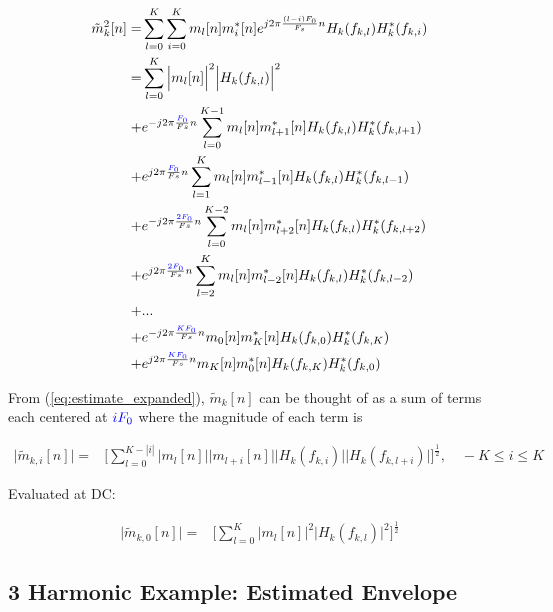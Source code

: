 \documentclass [11pt, proquest,oneside] {ganter_thesis}[2015/03/03]
\newcommand*{\mathcolor}{}
\def\mathcolor#1#{\mathcoloraux{#1}}
\newcommand*{\mathcoloraux}[3]{%
  \protect\leavevmode
  \begingroup
    \color#1{#2}#3%
  \endgroup
}
\begin{document}
\begin{align}
\tilde{m}_k^2[n] =& \sum\limits_{l=0}^K \sum\limits_{i=0}^K m_l[n] m_i^*[n] e^{j2\pi\frac{(l-i)F_0}{F_s}n} H_k(f_{k,l})H_k^*(f_{k,i}) \\
%
%
%
\label{eq:estimate_expanded}
=& \sum\limits_{l=0}^K \Big|m_l[n]\Big|^2 \Big|H_k(f_{k,l})\Big|^2 \nonumber \\
%
%
+& e^{-j2\pi \frac{\mathcolor{blue}{F_0}}{Fs}n} \sum\limits_{l=0}^{K-1} m_l[n] m_{l+1}^*[n] H_k(f_{k,l})H_k^*(f_{k,l+1}) \nonumber \\
%
+&  e^{j2\pi \frac{\mathcolor{blue}{F_0}}{Fs}n} \sum\limits_{l=1}^{K} m_l[n] m_{l-1}^*[n] H_k(f_{k,l})H_k^*(f_{k,l-1}) \nonumber \\
%
%
+& e^{-j2\pi \frac{\mathcolor{blue}{2F_0}}{Fs}n} \sum\limits_{l=0}^{K-2} m_l[n] m_{l+2}^*[n] H_k(f_{k,l})H_k^*(f_{k,l+2}) \nonumber \\
%
+& e^{j2\pi \frac{\mathcolor{blue}{2F_0}}{Fs}n}  \sum\limits_{l=2}^{K} m_l[n] m_{l-2}^*[n] H_k(f_{k,l})H_k^*(f_{k,l-2}) \nonumber \\
%
%
+& ... \nonumber \\
%
%
+& e^{-j2\pi \frac{\mathcolor{blue}{KF_0}}{Fs}n} m_0[n] m_K^*[n] H_k(f_{k,0})H_k^*(f_{k,K}) \nonumber \\
%
+& e^{j2\pi \frac{\mathcolor{blue}{KF_0}}{Fs}n}  m_K[n] m_0^*[n] H_k(f_{k,K})H_k^*(f_{k,0})
\end{align}

From (\ref{eq:estimate_expanded}), $\tilde{m}_k[n]$ can be thought of as a sum of terms each centered at $\mathcolor{blue}{iF_0}$ where the magnitude of each term is

\begin{align}
\label{eq:m_k_ith_term}
\Big| \tilde{m}_{k,i}[n] \Big| =& \Bigg[ \sum\limits_{l=0}^{K-|i|} \Big| m_l[n]\Big| \Big|m_{l+i}[n]\Big| \Big|H_k(f_{k,i})\Big| \Big|H_k(f_{k,l+i})\Big|\Bigg]^\frac{1}{2}, \quad -K \leq i \leq K
\end{align}

Evaluated at DC:

\begin{align}
\label{eq:m_k_DC_term}
\Big| \tilde{m}_{k,0}[n] \Big| =& \Bigg[  \sum\limits_{l=0}^K \Big|m_l[n]\Big|^2 \Big|H_k(f_{k,l})\Big|^2 \Bigg]^\frac{1}{2}
\end{align}

\subsection{3 Harmonic Example: Estimated Envelope}
\end{document}
